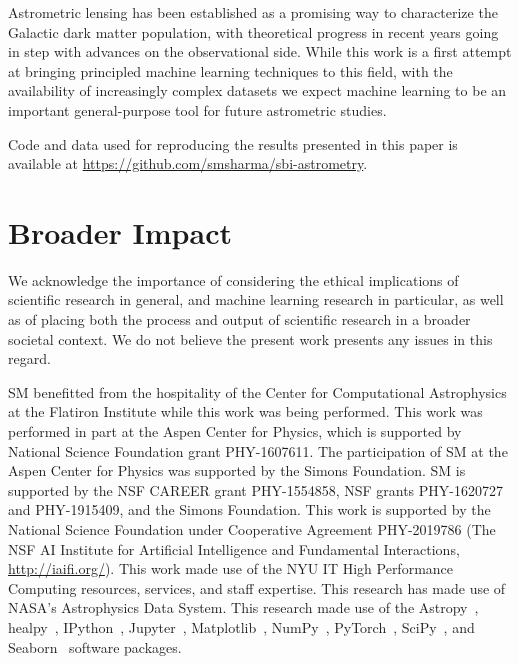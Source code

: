 \documentclass[]{article}
\begin{document}
Astrometric lensing has been established as a promising way to characterize the Galactic dark matter population, with theoretical progress in recent years going in step with advances on the observational side. While this work is a first attempt at bringing principled machine learning techniques to this field, with the availability of increasingly complex datasets we expect machine learning to be an important general-purpose tool for future astrometric studies.

Code and data used for reproducing the results presented in this paper is available at \url{https://github.com/smsharma/sbi-astrometry}.

\section*{Broader Impact}
\label{sec:impact}

We acknowledge the importance of considering the ethical implications of scientific research in general, and machine learning research in particular, as well as of placing both the process and output of scientific research in a broader societal context. We do not believe the present work presents any issues in this regard. 

\begin{ack}
SM benefitted from the hospitality of the Center for Computational Astrophysics at the Flatiron Institute while this work was being performed. 
This work was performed in part at the Aspen Center for Physics, which is supported by National Science Foundation grant PHY-1607611.
The participation of SM at the Aspen Center for Physics was supported by the Simons Foundation.
SM is supported by the NSF CAREER grant PHY-1554858, NSF grants PHY-1620727 and PHY-1915409, and the Simons Foundation. 
This work is supported by the National Science Foundation under Cooperative Agreement PHY-2019786 (The NSF AI Institute for Artificial Intelligence and Fundamental Interactions, \url{http://iaifi.org/}).
This work made use of the NYU IT High Performance Computing resources, services, and staff expertise. 
This research has made use of NASA's Astrophysics Data System. 
This research made use of the Astropy~\cite{Robitaille:2013mpa,Price-Whelan:2018hus},
healpy~\cite{Gorski:2004by,Zonca2019},
IPython~\cite{PER-GRA:2007},
Jupyter~\cite{Kluyver2016JupyterN},
Matplotlib~\cite{Hunter:2007},
NumPy~\cite{harris_array_2020},
PyTorch~\cite{NEURIPS2019_9015},
SciPy~\cite{2020SciPy-NMeth}, and
Seaborn~\cite{michael_waskom_2017_883859}
software packages.
\end{ack}
\end{document}
